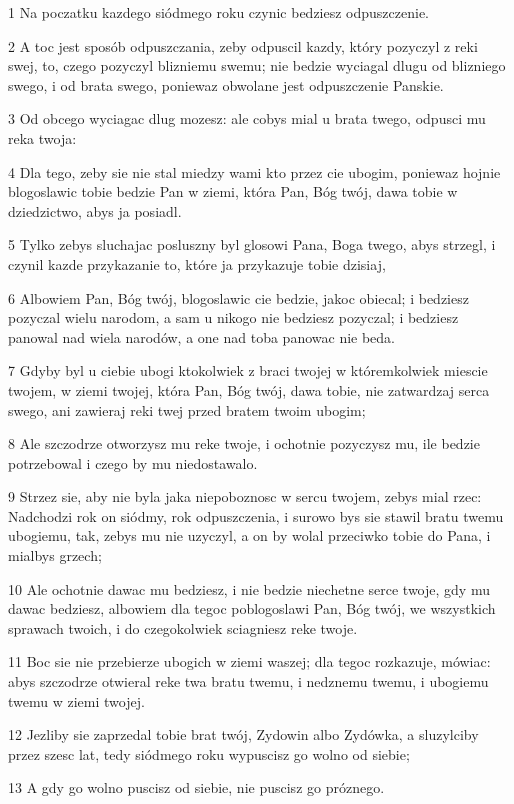 \par 1 Na poczatku kazdego siódmego roku czynic bedziesz odpuszczenie.
\par 2 A toc jest sposób odpuszczania, zeby odpuscil kazdy, który pozyczyl z reki swej, to, czego pozyczyl blizniemu swemu; nie bedzie wyciagal dlugu od blizniego swego, i od brata swego, poniewaz obwolane jest odpuszczenie Panskie.
\par 3 Od obcego wyciagac dlug mozesz: ale cobys mial u brata twego, odpusci mu reka twoja:
\par 4 Dla tego, zeby sie nie stal miedzy wami kto przez cie ubogim, poniewaz hojnie blogoslawic tobie bedzie Pan w ziemi, która Pan, Bóg twój, dawa tobie w dziedzictwo, abys ja posiadl.
\par 5 Tylko zebys sluchajac posluszny byl glosowi Pana, Boga twego, abys strzegl, i czynil kazde przykazanie to, które ja przykazuje tobie dzisiaj,
\par 6 Albowiem Pan, Bóg twój, blogoslawic cie bedzie, jakoc obiecal; i bedziesz pozyczal wielu narodom, a sam u nikogo nie bedziesz pozyczal; i bedziesz panowal nad wiela narodów, a one nad toba panowac nie beda.
\par 7 Gdyby byl u ciebie ubogi ktokolwiek z braci twojej w któremkolwiek miescie twojem, w ziemi twojej, która Pan, Bóg twój, dawa tobie, nie zatwardzaj serca swego, ani zawieraj reki twej przed bratem twoim ubogim;
\par 8 Ale szczodrze otworzysz mu reke twoje, i ochotnie pozyczysz mu, ile bedzie potrzebowal i czego by mu niedostawalo.
\par 9 Strzez sie, aby nie byla jaka niepoboznosc w sercu twojem, zebys mial rzec: Nadchodzi rok on siódmy, rok odpuszczenia, i surowo bys sie stawil bratu twemu ubogiemu, tak, zebys mu nie uzyczyl, a on by wolal przeciwko tobie do Pana, i mialbys grzech;
\par 10 Ale ochotnie dawac mu bedziesz, i nie bedzie niechetne serce twoje, gdy mu dawac bedziesz, albowiem dla tegoc poblogoslawi Pan, Bóg twój, we wszystkich sprawach twoich, i do czegokolwiek sciagniesz reke twoje.
\par 11 Boc sie nie przebierze ubogich w ziemi waszej; dla tegoc rozkazuje, mówiac: abys szczodrze otwieral reke twa bratu twemu, i nedznemu twemu, i ubogiemu twemu w ziemi twojej.
\par 12 Jezliby sie zaprzedal tobie brat twój, Zydowin albo Zydówka, a sluzylciby przez szesc lat, tedy siódmego roku wypuscisz go wolno od siebie;
\par 13 A gdy go wolno puscisz od siebie, nie puscisz go próznego.
